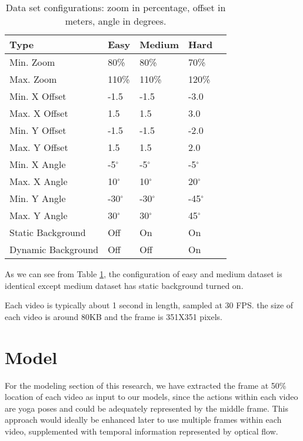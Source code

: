 \documentclass[
	a4paper, %
	10pt, %
	unnumberedsections, %
	twoside, %
]{t0004}
\begin{document}
\begin{table} %
	\caption{Data set configurations: zoom in percentage, offset in meters, angle in degrees.}
	\centering
	\begin{tabular}{l l l l r}
		\toprule
		Type & Easy & Medium & Hard  \\
		\midrule
		Min. Zoom & 80\% & 80\% & 70\% \\
		Max. Zoom & 110\% &  110\% & 120\%  \\
		\hline
		Min. X Offset & -1.5 & -1.5 & -3.0 \\
		Max. X Offset &  1.5 & 1.5 & 3.0 \\
		\hline
		Min. Y Offset & -1.5 & -1.5 & -2.0 \\
		Max. Y Offset &  1.5 & 1.5 & 2.0 \\
		\hline
		Min. X Angle & -5$^{\circ}$ & -5$^{\circ}$ & -5$^{\circ}$ \\
		Max. X Angle & 10$^{\circ}$ & 10$^{\circ}$ & 20$^{\circ}$ \\
		\hline
		Min. Y Angle & -30$^{\circ}$ & -30$^{\circ}$ & -45$^{\circ}$ \\
		Max. Y Angle & 30$^{\circ}$ & 30$^{\circ}$ & 45$^{\circ}$ \\
		\hline
		Static Background & Off & On & On \\
		Dynamic Background & Off & Off & On \\
		\bottomrule
	\end{tabular}
	\label{tab:dataconfig}
\end{table}

As we can see from Table \ref{tab:dataconfig}, the configuration of easy and medium dataset is identical except medium dataset has static background turned on.

Each video is typically about 1 second in length, sampled at 30 FPS. the size of each video is around 80KB and the frame is 351X351 pixels.

\section{Model}

For the modeling section of this research, we have extracted the frame at 50\% location of each video as input to our models, since the actions within each video are yoga poses and could be adequately represented by the middle frame. This approach would ideally be enhanced later to use multiple frames within each video, supplemented with temporal information represented by optical flow.
\end{document}
